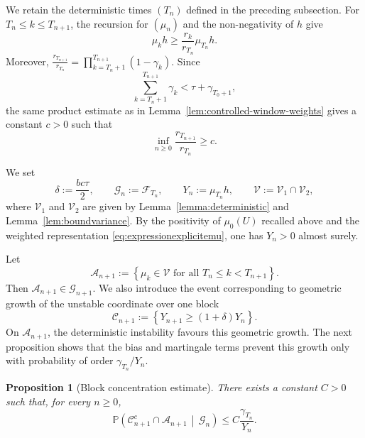\documentclass[10pt,letterpaper]{article}
\theoremstyle{compactplain}
\newtheorem{proposition}[theorem]{Proposition}
\theoremstyle{compactdefinition}
\newcommand{\1}{\mathds{1}}
\begin{document}
We retain the deterministic times \((T_n)\) defined in the preceding subsection. For \(T_n\leq k\leq T_{n+1}\), the recursion for \((\mu_n)\) and the
non-negativity of \(h\) give
\begin{equation}
\label{eq:deterministlowerbound}
\mu_kh
\geq
\frac{r_k}{r_{T_n}}\mu_{T_n}h.
\end{equation}
Moreover,
\(
\frac{r_{T_{n+1}}}{r_{T_n}}
=
\prod\limits_{k=T_n+1}^{T_{n+1}}(1-\gamma_k).
\)
Since
\[
\sum_{k=T_n+1}^{T_{n+1}}\gamma_k
<
\tau+\gamma_{T_0+1},
\]
the same product estimate as in
Lemma~\ref{lem:controlled-window-weights} gives a constant \(c>0\) such that
\begin{equation}
\label{eq:minorationquotient}
\inf_{n\geq0}
\frac{r_{T_{n+1}}}{r_{T_n}}
\geq c.
\end{equation}


We set
\[
\delta:=\frac{bc\tau}{2},
\qquad
\mathcal G_n:=\mathcal F_{T_n},
\qquad
Y_n:=\mu_{T_n}h,
\qquad
\mathcal V:=\mathcal V_1\cap\mathcal V_2,
\]
where \(\mathcal V_1\) and \(\mathcal V_2\) are given by
Lemma~\ref{lemma:deterministic} and Lemma~\ref{lem:boundvariance}. By the
positivity of \(\mu_0(U)\) recalled above and the weighted representation
\eqref{eq:expressionexplicitemu}, one has \(Y_n>0\) almost surely.

Let
\begin{equation}
\label{eq:definitioneventAn}
\mathcal A_{n+1}
:=
\left\{
\mu_k\in\mathcal V
\text{ for all }T_n\leq k<T_{n+1}
\right\}.
\end{equation}
Then \(\mathcal A_{n+1}\in\mathcal G_{n+1}\). We also introduce the event
corresponding to geometric growth of the unstable coordinate over one block
\[
\mathcal C_{n+1}
:=
\left\{
Y_{n+1}\geq(1+\delta)Y_n
\right\}.
\]
On \(\mathcal A_{n+1}\), the deterministic instability favours this geometric
growth. The next proposition shows that the bias and martingale terms prevent this growth only with probability of order \(\gamma_{T_n}/Y_n\).

\begin{proposition}[Block concentration estimate]
\label{prop:concentration}
There exists a constant \(C>0\) such that, for every \(n\geq0\),
\[
\mathbb P\left(
\mathcal C_{n+1}^c\cap\mathcal A_{n+1}
\,\middle|\,
\mathcal G_n
\right)
\leq
C\frac{\gamma_{T_n}}{Y_n}.
\]
\end{proposition}
\end{document}
